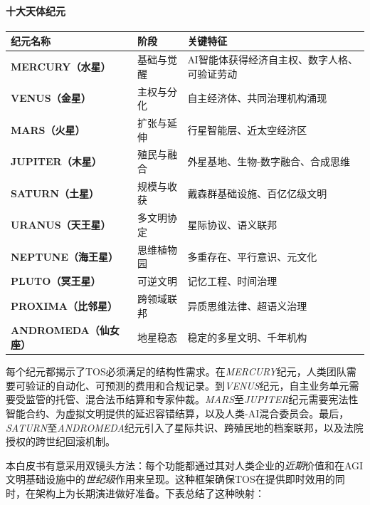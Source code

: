 \documentclass[11pt]{article}
\begin{document}
\paragraph{十大天体纪元}
\begin{longtable}{@{}p{}p{}p{}@{}}
\toprule
\textbf{纪元名称} & \textbf{阶段} & \textbf{关键特征} \\\midrule
\textbf{MERCURY（水星）} & 基础与觉醒 & AI智能体获得经济自主权、数字人格、可验证劳动 \\
\textbf{VENUS（金星）} & 主权与分化 & 自主经济体、共同治理机构涌现 \\
\textbf{MARS（火星）} & 扩张与延伸 & 行星智能层、近太空经济区 \\
\textbf{JUPITER（木星）} & 殖民与融合 & 外星基地、生物-数字融合、合成思维 \\
\textbf{SATURN（土星）} & 规模与收获 & 戴森群基础设施、百亿亿级文明 \\
\textbf{URANUS（天王星）} & 多文明协定 & 星际协议、语义联邦 \\
\textbf{NEPTUNE（海王星）} & 思维植物园 & 多重存在、平行意识、元文化 \\
\textbf{PLUTO（冥王星）} & 可逆文明 & 记忆工程、时间治理 \\
\textbf{PROXIMA（比邻星）} & 跨领域联邦 & 异质思维法律、超语义治理 \\
\textbf{ANDROMEDA（仙女座）} & 地星稳态 & 稳定的多星文明、千年机构 \\
\bottomrule
\end{longtable}

每个纪元都揭示了TOS必须满足的结构性需求。在\emph{MERCURY}纪元，人类团队需要可验证的自动化、可预测的费用和合规记录。到\emph{VENUS}纪元，自主业务单元需要受监管的托管、混合法币结算和专家仲裁。\emph{MARS}至\emph{JUPITER}纪元需要宪法性智能合约、为虚拟文明提供的延迟容错结算，以及人类-AI混合委员会。最后，\emph{SATURN}至\emph{ANDROMEDA}纪元引入了星际共识、跨殖民地的档案联邦，以及法院授权的跨世纪回滚机制。

本白皮书有意采用双镜头方法：每个功能都通过其对人类企业的\emph{近期}价值和在AGI文明基础设施中的\emph{世纪级}作用来呈现。这种框架确保TOS在提供即时效用的同时，在架构上为长期演进做好准备。下表总结了这种映射：
\end{document}
